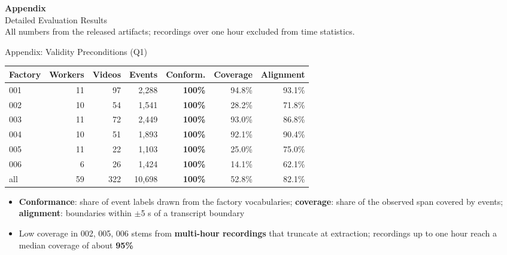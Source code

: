 \documentclass[aspectratio=169]{beamer}
\newcommand{\keyc}[1]{\textbf{\textcolor{egoblue}{#1}}}
\newcommand{\keyg}[1]{\textbf{\textcolor{egogreen!70!black}{#1}}}
\newcommand{\keya}[1]{\textbf{\textcolor{egoamber!85!black}{#1}}}
\begin{document}
\appendix

\begin{frame}
  \centering
  {\LARGE \textbf{\textcolor{egoblue}{Appendix}}}\\[3mm]
  {\large Detailed Evaluation Results}\\[5mm]
  \small All numbers from the released artifacts; recordings over one hour
  excluded from time statistics.
\end{frame}

\begin{frame}{Appendix: Validity Preconditions (Q1)}
  \begin{center}
  \small
  \begin{tabular}{lrrrrrr}
    \toprule
    Factory & Workers & Videos & Events & Conform. & Coverage & Alignment \\
    \midrule
    001 & 11 & 97 & 2{,}288 & \keyg{100\%} & 94.8\% & 93.1\% \\
    002 & 10 & 54 & 1{,}541 & \keyg{100\%} & 28.2\% & 71.8\% \\
    003 & 11 & 72 & 2{,}449 & \keyg{100\%} & 93.0\% & 86.8\% \\
    004 & 10 & 51 & 1{,}893 & \keyg{100\%} & 92.1\% & 90.4\% \\
    005 & 11 & 22 & 1{,}103 & \keyg{100\%} & 25.0\% & 75.0\% \\
    006 &  6 & 26 & 1{,}424 & \keyg{100\%} & 14.1\% & 62.1\% \\
    \midrule
    all & 59 & 322 & 10{,}698 & \keyg{100\%} & 52.8\% & 82.1\% \\
    \bottomrule
  \end{tabular}
  \end{center}
  \vspace{2mm}
  \begin{itemize}\setlength{\itemsep}{5pt}
    \item \keyc{Conformance}: share of event labels drawn from the factory
      vocabularies; \keyc{coverage}: share of the observed span covered by
      events; \keyc{alignment}: boundaries within $\pm$5 s of a transcript
      boundary
    \item Low coverage in 002, 005, 006 stems from \keya{multi-hour recordings}
      that truncate at extraction; recordings up to one hour reach a median
      coverage of about \keyg{95\%}
  \end{itemize}
\end{frame}
\end{document}
